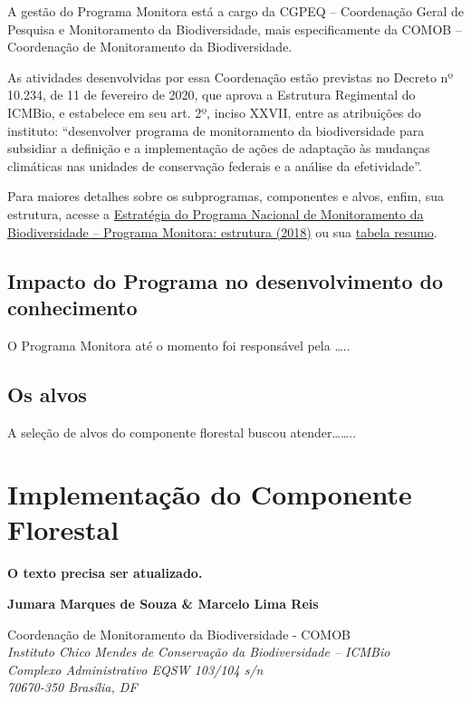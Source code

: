 \documentclass[
  letterpaper,
]{scrbook}
\begin{document}
A gestão do Programa Monitora está a cargo da CGPEQ -- Coordenação Geral
de Pesquisa e Monitoramento da Biodiversidade, mais especificamente da
COMOB -- Coordenação de Monitoramento da Biodiversidade.

As atividades desenvolvidas por essa Coordenação estão previstas no
Decreto nº 10.234, de 11 de fevereiro de 2020, que aprova a Estrutura
Regimental do ICMBio, e estabelece em seu art. 2º, inciso XXVII, entre
as atribuições do instituto: ``desenvolver programa de monitoramento da
biodiversidade para subsidiar a definição e a implementação de ações de
adaptação às mudanças climáticas nas unidades de conservação federais e
a análise da efetividade''.

Para maiores detalhes sobre os subprogramas, componentes e alvos, enfim,
sua estrutura, acesse a
\href{https://www.gov.br/icmbio/pt-br/assuntos/monitoramento/conteudo/Materiais-de-Apoio/estrategia_geral.pdf}{Estratégia
do Programa Nacional de Monitoramento da Biodiversidade -- Programa
Monitora: estrutura (2018)} ou sua
\href{https://www.gov.br/icmbio/pt-br/assuntos/monitoramento/conteudo/estrutura-do-programa-monitora/2b5210461815403eb185f1aceee3b192.pdf}{tabela
resumo}.

\section{Impacto do Programa no desenvolvimento do
conhecimento}\label{impacto-do-programa-no-desenvolvimento-do-conhecimento}

O Programa Monitora até o momento foi responsável pela \ldots..

\section{Os alvos}\label{os-alvos}

A seleção de alvos do componente florestal buscou atender\ldots\ldots..


\chapter{Implementação do Componente
Florestal}\label{implementauxe7uxe3o-do-componente-florestal}

\textbf{O texto precisa ser atualizado.}

\textbf{Jumara Marques de Souza \& Marcelo Lima Reis}

Coordenação de Monitoramento da Biodiversidade - COMOB\\
\emph{Instituto Chico Mendes de Conservação da Biodiversidade --
ICMBio}\\
\emph{Complexo Administrativo EQSW 103/104 s/n}\\
\emph{70670-350 Brasília, DF}
\end{document}
